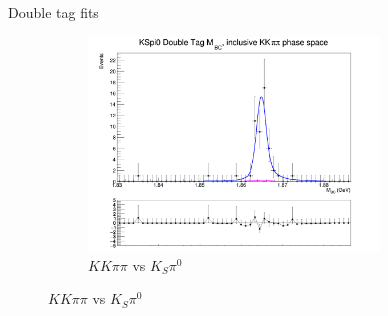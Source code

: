 \documentclass{beamer}
\begin{document}
\begin{frame}{Double tag fits}
\begin{figure}
\begin{subfigure}{0.5\textwidth}
      \includegraphics[width=0.85\textwidth]{Plots/DoubleTagYield_DoubleTag_CP_KKpipi_vs_KSpi0_SignalBin0.png}
      \caption{$KK\pi\pi$ vs $K_S\pi^0$}
    \end{subfigure}
  \end{figure}
\end{frame}
\end{document}
